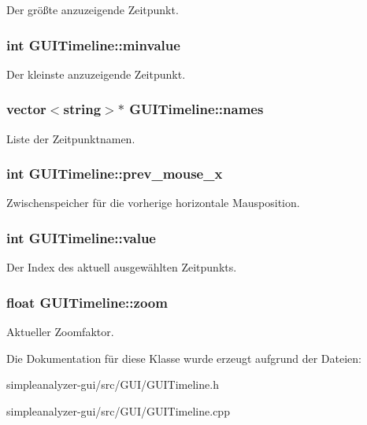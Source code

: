 Der größte anzuzeigende Zeitpunkt. \hypertarget{classGUITimeline_aad9f2b796d0d7c086cfe0094b3ef10c5}{
\subsubsection[{minvalue}]{\setlength{\rightskip}{0pt plus 5cm}int G\-U\-I\-Timeline\-::minvalue\hspace{0.3cm}{\ttfamily [private]}}}\label{classGUITimeline_aad9f2b796d0d7c086cfe0094b3ef10c5}
Der kleinste anzuzeigende Zeitpunkt. \hypertarget{classGUITimeline_adcdd8d58db7851c24ab9dfdfe1377ffb}{
\subsubsection[{names}]{\setlength{\rightskip}{0pt plus 5cm}vector$<$string$>$$\ast$ G\-U\-I\-Timeline\-::names\hspace{0.3cm}{\ttfamily [private]}}}\label{classGUITimeline_adcdd8d58db7851c24ab9dfdfe1377ffb}
Liste der Zeitpunktnamen. \hypertarget{classGUITimeline_a16d456832948e97e9364856f92d97f5c}{
\subsubsection[{prev\-\_\-mouse\-\_\-x}]{\setlength{\rightskip}{0pt plus 5cm}int G\-U\-I\-Timeline\-::prev\-\_\-mouse\-\_\-x\hspace{0.3cm}{\ttfamily [private]}}}\label{classGUITimeline_a16d456832948e97e9364856f92d97f5c}
Zwischenspeicher für die vorherige horizontale Mausposition. \hypertarget{classGUITimeline_a0ba036e4a58176c5e868662510717ae2}{
\subsubsection[{value}]{\setlength{\rightskip}{0pt plus 5cm}int G\-U\-I\-Timeline\-::value\hspace{0.3cm}{\ttfamily [private]}}}\label{classGUITimeline_a0ba036e4a58176c5e868662510717ae2}
Der Index des aktuell ausgewählten Zeitpunkts. \hypertarget{classGUITimeline_a9b5b63103a41b6e661cfb30acfcda448}{
\subsubsection[{zoom}]{\setlength{\rightskip}{0pt plus 5cm}float G\-U\-I\-Timeline\-::zoom\hspace{0.3cm}{\ttfamily [private]}}}\label{classGUITimeline_a9b5b63103a41b6e661cfb30acfcda448}
Aktueller Zoomfaktor. 

Die Dokumentation für diese Klasse wurde erzeugt aufgrund der Dateien\-:\begin{DoxyCompactItemize}
\item 
simpleanalyzer-\/gui/src/\-G\-U\-I/G\-U\-I\-Timeline.\-h\item 
simpleanalyzer-\/gui/src/\-G\-U\-I/G\-U\-I\-Timeline.\-cpp\end{DoxyCompactItemize}
